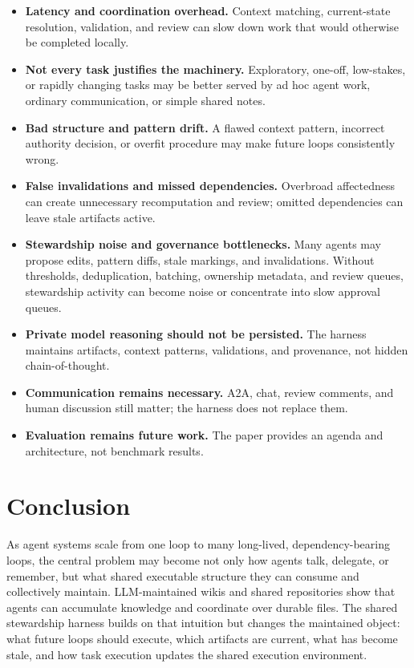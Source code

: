 \documentclass{article}
\begin{document}
\begin{itemize}[leftmargin=*]
\item \textbf{Latency and coordination overhead.} Context matching, current-state resolution, validation, and review can slow down work that would otherwise be completed locally.
\item \textbf{Not every task justifies the machinery.} Exploratory, one-off, low-stakes, or rapidly changing tasks may be better served by ad hoc agent work, ordinary communication, or simple shared notes.
\item \textbf{Bad structure and pattern drift.} A flawed context pattern, incorrect authority decision, or overfit procedure may make future loops consistently wrong.
\item \textbf{False invalidations and missed dependencies.} Overbroad affectedness can create unnecessary recomputation and review; omitted dependencies can leave stale artifacts active.
\item \textbf{Stewardship noise and governance bottlenecks.} Many agents may propose edits, pattern diffs, stale markings, and invalidations. Without thresholds, deduplication, batching, ownership metadata, and review queues, stewardship activity can become noise or concentrate into slow approval queues.
\item \textbf{Private model reasoning should not be persisted.} The harness maintains artifacts, context patterns, validations, and provenance, not hidden chain-of-thought.
\item \textbf{Communication remains necessary.} A2A, chat, review comments, and human discussion still matter; the harness does not replace them.
\item \textbf{Evaluation remains future work.} The paper provides an agenda and architecture, not benchmark results.
\end{itemize}

\section{Conclusion}

As agent systems scale from one loop to many long-lived, dependency-bearing loops, the central problem may become not only how agents talk, delegate, or remember, but what shared executable structure they can consume and collectively maintain. LLM-maintained wikis and shared repositories show that agents can accumulate knowledge and coordinate over durable files. The shared stewardship harness builds on that intuition but changes the maintained object: what future loops should execute, which artifacts are current, what has become stale, and how task execution updates the shared execution environment.
\end{document}
